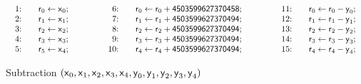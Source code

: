 \begin{figure}[ht]
  \centering
  \[
  \begin{array}{lclcl}
    \begin{array}{rcl}
    \textmd{1:} && \dslcode{r}_0 \leftarrow \dslcode{x}_0; \\
    \textmd{2:} && \dslcode{r}_1 \leftarrow \dslcode{x}_1; \\
    \textmd{3:} && \dslcode{r}_2 \leftarrow \dslcode{x}_2; \\
    \textmd{4:} && \dslcode{r}_3 \leftarrow \dslcode{x}_3; \\
    \textmd{5:} && \dslcode{r}_5 \leftarrow \dslcode{x}_4; \\
    \end{array}
    &\hspace{.05\textwidth}&
    \begin{array}{rcl}
    \textmd{6:} && 
      \dslcode{r}_0 \leftarrow \dslcode{r}_0 + \dslcode{4503599627370458}; \\
    \textmd{7:} &&
      \dslcode{r}_1 \leftarrow \dslcode{r}_1 + \dslcode{4503599627370494}; \\
    \textmd{8:} &&
      \dslcode{r}_2 \leftarrow \dslcode{r}_2 + \dslcode{4503599627370494}; \\
    \textmd{9:} &&
      \dslcode{r}_3 \leftarrow \dslcode{r}_3 + \dslcode{4503599627370494}; \\
    \textmd{10:} && 
      \dslcode{r}_4 \leftarrow \dslcode{r}_4 + \dslcode{4503599627370494};\\
    \end{array}
    &\hspace{.05\textwidth}&
    \begin{array}{rcl}
    \textmd{11:} && \dslcode{r}_0 \leftarrow \dslcode{r}_0 - \dslcode{y}_0; \\
    \textmd{12:} && \dslcode{r}_1 \leftarrow \dslcode{r}_1 - \dslcode{y}_1; \\
    \textmd{13:} && \dslcode{r}_2 \leftarrow \dslcode{r}_2 - \dslcode{y}_2; \\
    \textmd{14:} && \dslcode{r}_3 \leftarrow \dslcode{r}_3 - \dslcode{y}_3; \\
    \textmd{15:} && \dslcode{r}_4 \leftarrow \dslcode{r}_4 - \dslcode{y}_4;
    \end{array}
  \end{array}
  \]
  \caption{Subtraction $(\mbox{\textsf{x}}_0, \mbox{\textsf{x}}_1, 
    \mbox{\textsf{x}}_2, \mbox{\textsf{x}}_3, \mbox{\textsf{x}}_4, \mbox{\textsf{y}}_0,
    \mbox{\textsf{y}}_1, \mbox{\textsf{y}}_2, \mbox{\textsf{y}}_3, \mbox{\textsf{y}}_4)$}
  \label{figure:dsl:subtraction}
\end{figure}

